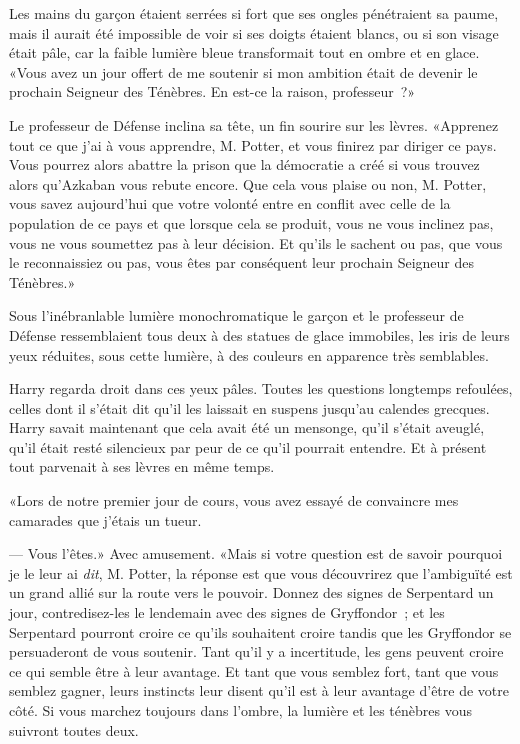 Les mains du garçon étaient serrées si fort que ses ongles pénétraient sa paume, mais il aurait été impossible de voir si ses doigts étaient blancs, ou si son visage était pâle, car la faible lumière bleue transformait tout en ombre et en glace. «Vous avez un jour offert de me soutenir si mon ambition était de devenir le prochain Seigneur des Ténèbres. En est-ce la raison, professeur~?»

Le professeur de Défense inclina sa tête, un fin sourire sur les lèvres. «Apprenez tout ce que j'ai à vous apprendre, M. Potter, et vous finirez par diriger ce pays. Vous pourrez alors abattre la prison que la démocratie a créé si vous trouvez alors qu'Azkaban vous rebute encore. Que cela vous plaise ou non, M. Potter, vous savez aujourd'hui que votre volonté entre en conflit avec celle de la population de ce pays et que lorsque cela se produit, vous ne vous inclinez pas, vous ne vous soumettez pas à leur décision. Et qu'ils le sachent ou pas, que vous le reconnaissiez ou pas, vous êtes par conséquent leur prochain Seigneur des Ténèbres.»

Sous l'inébranlable lumière monochromatique le garçon et le professeur de Défense ressemblaient tous deux à des statues de glace immobiles, les iris de leurs yeux réduites, sous cette lumière, à des couleurs en apparence très semblables.

Harry regarda droit dans ces yeux pâles. Toutes les questions longtemps refoulées, celles dont il s'était dit qu'il les laissait en suspens jusqu'au calendes grecques. Harry savait maintenant que cela avait été un mensonge, qu'il s'était aveuglé, qu'il était resté silencieux par peur de ce qu'il pourrait entendre. Et à présent tout parvenait à ses lèvres en même temps.

«Lors de notre premier jour de cours, vous avez essayé de convaincre mes camarades que j'étais un tueur.

--- Vous l'êtes.» Avec amusement. «Mais si votre question est de savoir pourquoi je le leur ai \emph{dit}, M. Potter, la réponse est que vous découvrirez que l'ambiguïté est un grand allié sur la route vers le pouvoir. Donnez des signes de Serpentard un jour, contredisez-les le lendemain avec des signes de Gryffondor~; et les Serpentard pourront croire ce qu'ils souhaitent croire tandis que les Gryffondor se persuaderont de vous soutenir. Tant qu'il y a incertitude, les gens peuvent croire ce qui semble être à leur avantage. Et tant que vous semblez fort, tant que vous semblez gagner, leurs instincts leur disent qu'il est à leur avantage d'être de votre côté. Si vous marchez toujours dans l'ombre, la lumière et les ténèbres vous suivront toutes deux.

